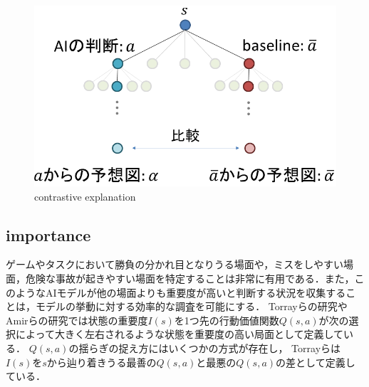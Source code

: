 \begin{figure}[htbp]
	\centering
	\includegraphics[width=\linewidth]{./figure/contrastive.png}
	\caption{contrastive explanation}
	\label{fig:contrastive}
\end{figure}
\subsection{importance}
ゲームやタスクにおいて勝負の分かれ目となりうる場面や，ミスをしやすい場面，危険な事故が起きやすい場面を特定することは非常に有用である．また，このようなAIモデルが他の場面よりも重要度が高いと判断する状況を収集することは，モデルの挙動に対する効率的な調査を可能にする．
Torrayらの研究\cite{imp2013}やAmirらの研究\cite{imp2016}では状態の重要度$I(s)$を1つ先の行動価値関数$Q(s, a)$が次の選択によって大きく左右されるような状態を重要度の高い局面として定義している．
$Q(s, a)$の揺らぎの捉え方にはいくつかの方式が存在し，
Torrayらは$I(s)$を$s$から辿り着きうる最善の$Q(s, a)$と最悪の$Q(s, a)$の差として定義している．

